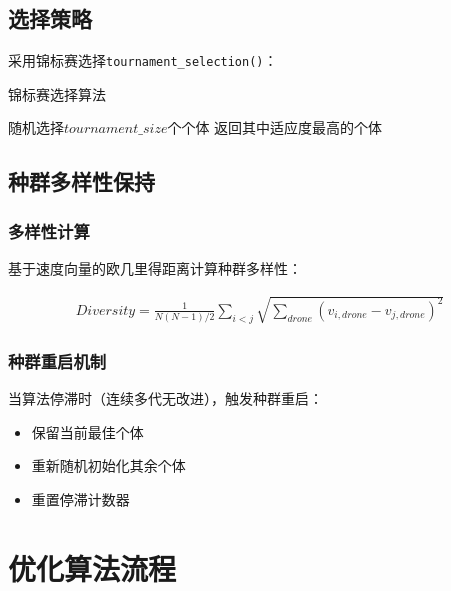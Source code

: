 \documentclass{article}
\begin{document}
\subsection{选择策略}

采用锦标赛选择\texttt{tournament\_selection()}：

\begin{algorithm}[H]
\caption{锦标赛选择算法}
\begin{algorithmic}[1]
\STATE 随机选择$tournament\_size$个个体
\STATE 返回其中适应度最高的个体
\end{algorithmic}
\end{algorithm}

\subsection{种群多样性保持}

\subsubsection{多样性计算}
基于速度向量的欧几里得距离计算种群多样性：

\begin{align}
Diversity = \frac{1}{N(N-1)/2} \sum_{i<j} \sqrt{\sum_{drone}(v_{i,drone} - v_{j,drone})^2}
\end{align}

\subsubsection{种群重启机制}
当算法停滞时（连续多代无改进），触发种群重启：
\begin{itemize}
    \item 保留当前最佳个体
    \item 重新随机初始化其余个体
    \item 重置停滞计数器
\end{itemize}

\section{优化算法流程}
\end{document}
